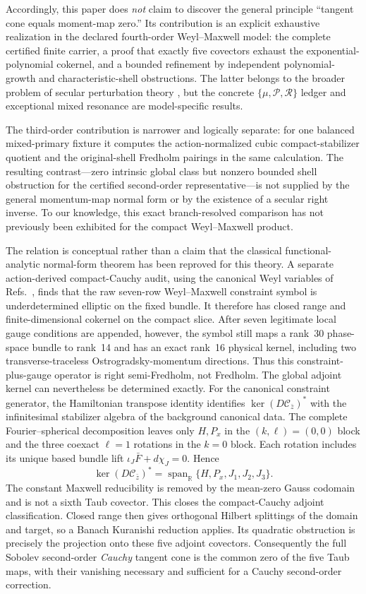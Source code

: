 \documentclass[11pt]{article}
\theoremstyle{definition}
\theoremstyle{remark}
\begin{document}
Accordingly, this paper does \emph{not} claim to discover the general
principle ``tangent cone equals moment-map zero.''  Its contribution is an
explicit exhaustive realization in the declared fourth-order Weyl--Maxwell
model: the complete certified finite carrier, a proof that exactly five
covectors exhaust the exponential-polynomial cokernel, and a bounded
refinement by independent polynomial-growth and characteristic-shell
obstructions.  The latter belongs to the broader problem of secular
perturbation theory \cite{Pound}, but the concrete
\(\{\mu,\mathcal P,\mathcal R\}\) ledger and exceptional mixed resonance are
model-specific results.

The third-order contribution is narrower and logically separate: for one
balanced mixed-primary fixture it computes the action-normalized cubic
compact-stabilizer quotient and the original-shell Fredholm pairings in the
same calculation.  The resulting contrast---zero intrinsic global class but
nonzero bounded shell obstruction for the certified second-order
representative---is not supplied by the general momentum-map normal form or
by the existence of a secular right inverse.  To our knowledge, this exact
branch-resolved comparison has not previously been exhibited for the compact
Weyl--Maxwell product.

The relation is conceptual rather than a claim that the classical
functional-analytic normal-form theorem has been reproved for this theory.
A separate action-derived compact-Cauchy audit, using the canonical Weyl
variables of Refs.~\cite{KieferNikolic,ChenMa}, finds that the raw seven-row
Weyl--Maxwell constraint symbol is underdetermined elliptic on the fixed
bundle.  It therefore has closed range and finite-dimensional cokernel on
the compact slice.  After seven legitimate local gauge conditions are
appended, however, the symbol still maps a rank~30 phase-space bundle to
rank~14 and has an exact rank~16 physical kernel, including two
transverse-traceless Ostrogradsky-momentum directions.  Thus this
constraint-plus-gauge operator is right semi-Fredholm, not Fredholm.
The global adjoint kernel can nevertheless be determined exactly.  For the
canonical constraint generator, the Hamiltonian transpose identity identifies
\(\ker(D\mathcal C_{\bar z})^*\) with the infinitesimal stabilizer algebra of
the background canonical data.  The complete Fourier--spherical decomposition
leaves only \(H,P_x\) in the \((k,\ell)=(0,0)\) block and the three coexact
\(\ell=1\) rotations in the \(k=0\) block.  Each rotation includes its unique
based bundle lift \(\iota_J\bar F+d\chi_J=0\).  Hence
\[
 \ker(D\mathcal C_{\bar z})^*
 =\operatorname{span}_{\mathbb R}\{H,P_x,J_1,J_2,J_3\}.
\]
The constant Maxwell reducibility is removed by the mean-zero Gauss codomain
and is not a sixth Taub covector.  This closes the compact-Cauchy adjoint
classification.  Closed range then gives orthogonal Hilbert splittings of the
domain and target, so a Banach Kuranishi reduction applies.  Its quadratic
obstruction is precisely the projection onto these five adjoint covectors.
Consequently the full Sobolev second-order \emph{Cauchy} tangent cone is the
common zero of the five Taub maps, with their vanishing necessary and
sufficient for a Cauchy second-order correction.
\end{document}
